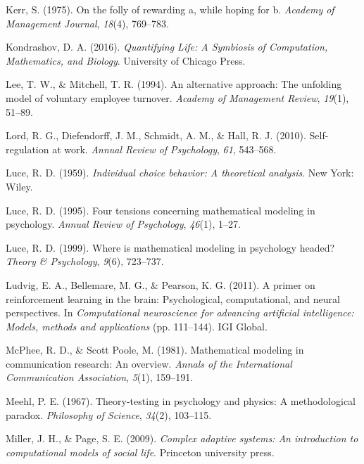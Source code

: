 \documentclass[english,,man]{apa6}
\theoremstyle{definition}
\theoremstyle{definition}
\theoremstyle{definition}
\theoremstyle{remark}
\begin{document}
\leavevmode\hypertarget{ref-kerr1975}{}%
Kerr, S. (1975). On the folly of rewarding a, while hoping for b.
\emph{Academy of Management Journal}, \emph{18}(4), 769--783.

\leavevmode\hypertarget{ref-kondrashov_quantifying_2016}{}%
Kondrashov, D. A. (2016). \emph{Quantifying Life: A Symbiosis of
Computation, Mathematics, and Biology}. University of Chicago Press.

\leavevmode\hypertarget{ref-lee1994alternative}{}%
Lee, T. W., \& Mitchell, T. R. (1994). An alternative approach: The
unfolding model of voluntary employee turnover. \emph{Academy of
Management Review}, \emph{19}(1), 51--89.

\leavevmode\hypertarget{ref-lord2010self}{}%
Lord, R. G., Diefendorff, J. M., Schmidt, A. M., \& Hall, R. J. (2010).
Self-regulation at work. \emph{Annual Review of Psychology}, \emph{61},
543--568.

\leavevmode\hypertarget{ref-luce1959}{}%
Luce, R. D. (1959). \emph{Individual choice behavior: A theoretical
analysis}. New York: Wiley.

\leavevmode\hypertarget{ref-luce1995}{}%
Luce, R. D. (1995). Four tensions concerning mathematical modeling in
psychology. \emph{Annual Review of Psychology}, \emph{46}(1), 1--27.

\leavevmode\hypertarget{ref-luce1999}{}%
Luce, R. D. (1999). Where is mathematical modeling in psychology headed?
\emph{Theory \& Psychology}, \emph{9}(6), 723--737.

\leavevmode\hypertarget{ref-ludvig_primer_2011}{}%
Ludvig, E. A., Bellemare, M. G., \& Pearson, K. G. (2011). A primer on
reinforcement learning in the brain: Psychological, computational, and
neural perspectives. In \emph{Computational neuroscience for advancing
artificial intelligence: Models, methods and applications} (pp.
111--144). IGI Global.

\leavevmode\hypertarget{ref-mcphee_mathematical_1981}{}%
McPhee, R. D., \& Scott Poole, M. (1981). Mathematical modeling in
communication research: An overview. \emph{Annals of the International
Communication Association}, \emph{5}(1), 159--191.

\leavevmode\hypertarget{ref-meehl1967}{}%
Meehl, P. E. (1967). Theory-testing in psychology and physics: A
methodological paradox. \emph{Philosophy of Science}, \emph{34}(2),
103--115.

\leavevmode\hypertarget{ref-miller2009}{}%
Miller, J. H., \& Page, S. E. (2009). \emph{Complex adaptive systems: An
introduction to computational models of social life}. Princeton
university press.
\end{document}
